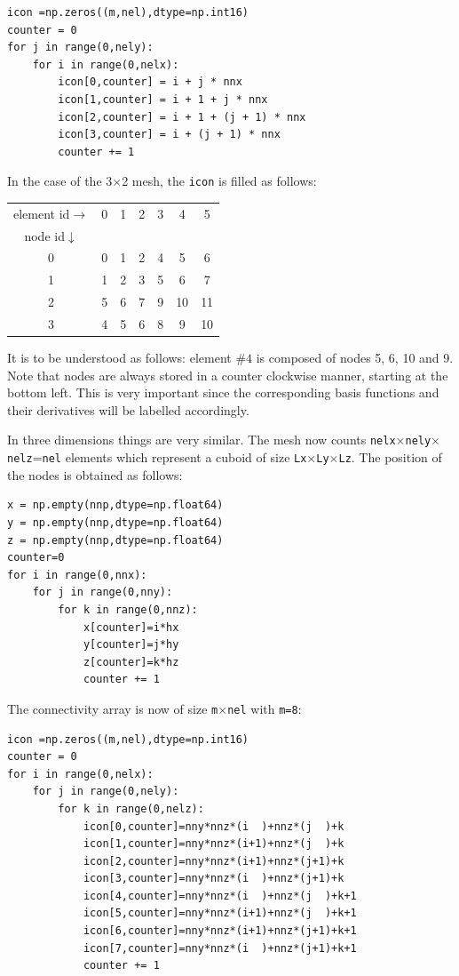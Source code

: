 \documentclass[a4paper]{article}
\begin{document}
\begin{lstlisting}
icon =np.zeros((m,nel),dtype=np.int16)
counter = 0
for j in range(0,nely):
    for i in range(0,nelx):
        icon[0,counter] = i + j * nnx 
        icon[1,counter] = i + 1 + j * nnx 
        icon[2,counter] = i + 1 + (j + 1) * nnx 
        icon[3,counter] = i + (j + 1) * nnx 
        counter += 1
\end{lstlisting}

In the case of the 3$\times$2 mesh, the {\tt icon} is filled as follows:
\begin{center}
\begin{tabular}{ccccccc}
element id$\rightarrow$ &0 &1&2&3&4&5 \\
node id$\downarrow$ \\
0& 0& 1& 2& 4& 5  &6\\
1& 1& 2& 3& 5& 6  &7\\
2& 5& 6& 7& 9& 10 &11\\
3& 4& 5& 6& 8& 9  &10\\
\end{tabular}
\end{center}
It is to be understood as follows: element $\#4$ is composed of nodes 5, 6, 10 and 9.
Note that nodes are always stored in a counter clockwise manner, starting at the bottom left.
This is very important since the corresponding basis functions and their derivatives 
will be labelled accordingly.

In three dimensions things are very similar. The mesh now counts 
{\tt nelx}$\times${\tt nely}$\times${\tt nelz}={\tt nel} elements which represent 
a cuboid of size {\tt Lx}$\times${\tt Ly}$\times${\tt Lz}.
The position of the nodes is obtained as follows:
\begin{lstlisting}
x = np.empty(nnp,dtype=np.float64)
y = np.empty(nnp,dtype=np.float64)
z = np.empty(nnp,dtype=np.float64)
counter=0
for i in range(0,nnx):
    for j in range(0,nny):
        for k in range(0,nnz):
            x[counter]=i*hx
            y[counter]=j*hy
            z[counter]=k*hz
            counter += 1
\end{lstlisting}
The connectivity array is now of size {\tt m}$\times${\tt nel} with {\tt m=8}:
\begin{lstlisting}
icon =np.zeros((m,nel),dtype=np.int16)
counter = 0
for i in range(0,nelx):
    for j in range(0,nely):
        for k in range(0,nelz):
            icon[0,counter]=nny*nnz*(i  )+nnz*(j  )+k
            icon[1,counter]=nny*nnz*(i+1)+nnz*(j  )+k
            icon[2,counter]=nny*nnz*(i+1)+nnz*(j+1)+k
            icon[3,counter]=nny*nnz*(i  )+nnz*(j+1)+k
            icon[4,counter]=nny*nnz*(i  )+nnz*(j  )+k+1
            icon[5,counter]=nny*nnz*(i+1)+nnz*(j  )+k+1
            icon[6,counter]=nny*nnz*(i+1)+nnz*(j+1)+k+1
            icon[7,counter]=nny*nnz*(i  )+nnz*(j+1)+k+1
            counter += 1
\end{lstlisting}
\end{document}
